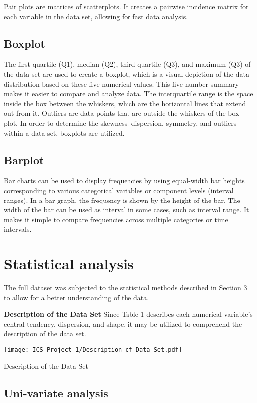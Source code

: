 \documentclass[12 pt]{scrartcl}
\begin{document}
Pair plots are matrices of scatterplots. It creates a pairwise incidence matrix for each variable in the data set, allowing for fast data analysis.

\subsection{Boxplot}
The first quartile (Q1), median (Q2), third quartile (Q3), and maximum (Q3) of the data set are used to create a boxplot, which is a visual depiction of the data distribution based on these five numerical values. This five-number summary makes it easier to compare and analyze data. The interquartile range is the space inside the box between the whiskers, which are the horizontal lines that extend out from it. Outliers are data points that are outside the whiskers of the box plot. In order to determine the skewness, dispersion, symmetry, and outliers within a data set, boxplots are utilized.\citep{R}

\subsection{Barplot}
Bar charts can be used to display frequencies by using equal-width bar heights corresponding to various categorical variables or component levels (interval ranges). In a bar graph, the frequency is shown by the height of the bar. The width of the bar can be used as interval in some cases, such as interval range. It makes it simple to compare frequencies across multiple categories or time intervals.\citep{R}

\section{Statistical analysis}
The full dataset was subjected to the statistical methods described in Section 3 to allow for a better understanding of the data.

\textbf{Description of the Data Set} Since Table 1 describes each numerical variable's central tendency, dispersion, and shape, it may be utilized to comprehend the description of the data set.


\begin{table}[ht]
    \centering
    \texttt{[image: ICS Project 1/Description of Data Set.pdf]}
    \caption{Description of the Data Set}
    \label{tab:my_label}
\end{table}


\subsection{Uni-variate analysis}
\end{document}
